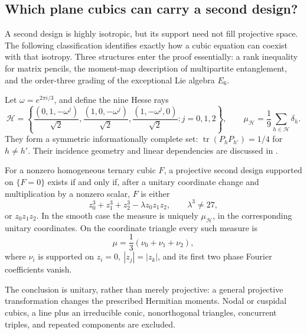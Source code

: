 \subsection{Which plane cubics can carry a second design?}
\label{geo:cubic-classification}

A second design is highly isotropic, but its support need not fill
projective space. The following classification identifies exactly how
a cubic equation can coexist with that isotropy. Three structures enter
the proof essentially: a rank inequality for matrix pencils, the
moment-map description of multipartite entanglement, and the order-three
grading of the exceptional Lie algebra \(E_6\).

Let \(\omega=e^{2\pi i/3}\), and define the nine Hesse rays
\begin{equation}
 \mathcal H=\left\{
 \frac{(0,1,-\omega^j)}{\sqrt2},
 \frac{(1,0,-\omega^j)}{\sqrt2},
 \frac{(1,-\omega^j,0)}{\sqrt2}:j=0,1,2\right\},
 \qquad
 \mu_{\mathcal H}=\frac19\sum_{h\in\mathcal H}\delta_h.
 \label{geo:hesse-points}
\end{equation}
They form a symmetric informationally complete set:
\(\operatorname{tr}(P_hP_{h'})=1/4\) for \(h\ne h'\).
Their incidence geometry and linear dependencies are discussed in
\cite{geo_hesse2009,geo_dang2013}.

\begin{theorem}
\label{geo:cubic}
For a nonzero homogeneous ternary cubic \(F\), a projective second design
supported on \(\{F=0\}\) exists if and only if, after a unitary coordinate
change and multiplication by a nonzero scalar, \(F\) is either
\[
 z_0^3+z_1^3+z_2^3-\lambda z_0z_1z_2,\qquad \lambda^3\ne27,
\]
or \(z_0z_1z_2\).
In the smooth case the measure is uniquely \(\mu_{\mathcal H}\), in the
corresponding unitary coordinates. On the coordinate triangle every such
measure is
\[
 \mu=\frac13(\nu_0+\nu_1+\nu_2),
\]
where \(\nu_i\) is supported on \(z_i=0,\ |z_j|=|z_k|\), and its
first two phase Fourier coefficients vanish.
\end{theorem}

The conclusion is unitary, rather than merely projective: a general
projective transformation changes the prescribed Hermitian moments.
Nodal or cuspidal cubics, a line plus an irreducible conic, nonorthogonal
triangles, concurrent triples, and repeated components are excluded.

